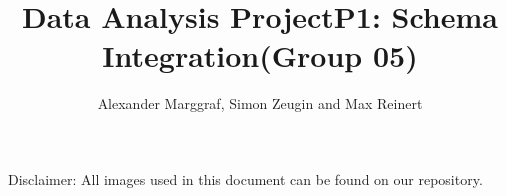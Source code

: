 \title{\texorpdfstring{Data Analysis Project\newline P1: Schema Integration\newline (Group 05)}
{Data Analysis Project P1: Schema Integration (Group 05)}} %
\author{Alexander Marggraf, Simon Zeugin and Max Reinert} %

\institute{\lectureInstitute} %
\begin{report}

Disclaimer: All images used in this document can be found on our repository.






%

\end{report}

